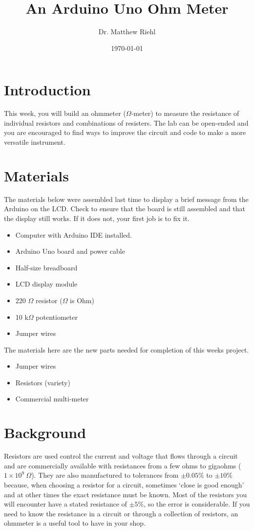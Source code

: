 \documentclass[]{article}
\title{An Arduino Uno Ohm Meter}
\author{Dr. Matthew Riehl}
\date \today
\begin{document}
\newcommand{\ds}{\displaystyle}
	\maketitle
	\newcommand{\tc}{\textcolor}
	\section{Introduction}
	
	This week, you will build an ohmmeter ($\Omega$-meter) to measure the resistance of individual resistors and combinations of resisters.  The lab can be open-ended and you are encouraged to find ways to improve the circuit and code to make a more versatile instrument.
	
	\section{Materials}
	The materials below were assembled last time to display a brief message from the Arduino on the LCD.  Check to ensure that the board is still assembled and that the display still works.  If it does not, your first job is to fix it.
	\begin{itemize}
		\item Computer with Arduino IDE installed.
		\item Arduino Uno board and power cable
		\item Half-size breadboard
		\item LCD display module
		\item 220 $\Omega$ resistor ($\Omega$ is Ohm)
		\item 10 k$\Omega$ potentiometer
		\item Jumper wires
	\end{itemize}
	The materials here are the new parts needed for completion of this weeks project.
	\begin{itemize}
		\item Jumper wires
		\item Resistors (variety)
		\item Commercial multi-meter
	\end{itemize}

	\section{Background}
	Resistors are used control the current and voltage that flows through a circuit and are commercially available with resistances from a few ohms to gigaohms ($1\times 10^9\ \Omega$).  They are also manufactured to tolerances from $\pm 0.05 \%$ to $\pm 10 \% $ because, when choosing a resistor for a circuit, sometimes `close is good enough' and at other times the exact resistance must be known.  Most of the resistors you will encounter have a stated resistance of $\pm 5\%$, so the error is considerable.  If you need to know the resistance in a circuit or through a collection of resistors, an ohmmeter is a useful tool to have in your shop.
\end{document}
